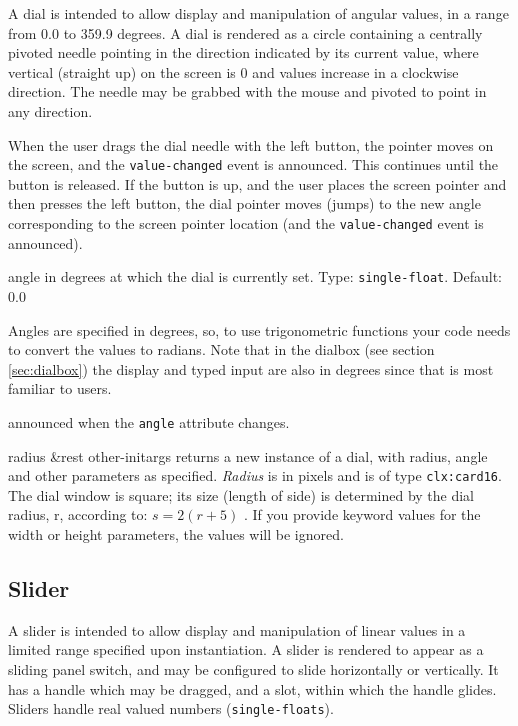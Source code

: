 \documentclass[twoside,openright,11pt]{report}
\newcommand{\tp}[1]{\texttt{#1}}
\begin{document}
A dial is intended to allow display and manipulation of
angular values, in a range from 0.0 to 359.9 degrees.  A dial is
rendered as a circle containing a centrally pivoted needle pointing in
the direction indicated by its current value, where vertical (straight
up) on the screen is 0 and values increase in a clockwise direction.
The needle may be grabbed with the mouse and pivoted to point in any
direction.

When the user drags the dial needle with the left button, the pointer
moves on the screen, and the \tp{value-changed} event is
announced.  This continues until the button is released.  If the
button is up, and the user places the screen pointer and then presses
the left button, the dial pointer moves (jumps) to the new angle
corresponding to the screen pointer location (and the
\tp{value-changed} event is announced).


{angle in degrees at which the dial is currently set.  Type:
\tp{single-float}.  Default: 0.0}

Angles are specified in degrees, so, to use trigonometric functions
your code needs to convert the values to radians.  Note that in the
dialbox (see section \ref{sec:dialbox}) the display and typed input
are also in degrees since that is most familiar to users.


{announced when the \tp{angle} attribute changes.}


{radius \&rest other-initargs}
{returns a new instance of a dial, with radius, angle and other
parameters as specified.  \emph{Radius} is in pixels and is of type
\tp{clx:card16}.  The dial window is square; its size (length of side)
is determined by the dial radius, r, according to: $s = 2 (r + 5)$ .
If you provide keyword values for the width or height parameters, the
values will be ignored.}

\subsection{Slider}

A slider is intended to allow display and manipulation
of linear values in a limited range specified upon instantiation.  A
slider is rendered to appear as a sliding panel switch, and may be
configured to slide horizontally or vertically.  It has a handle which
may be dragged, and a slot, within which the handle glides.  Sliders
handle real valued numbers (\tp{single-floats}).
\end{document}
